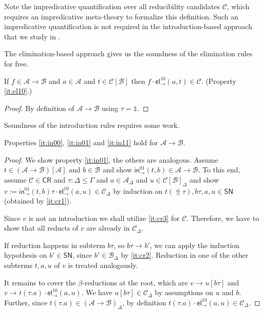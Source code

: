 \documentclass[a4paper,USenglish,cleveref, autoref, thm-restate]{lipics-v2021}
\newcommand{\sid}{\mathds{1}}
\newcommand{\tin}{\ensuremath{\mathsf{in}}}
\newcommand{\inn}[2]{\ensuremath{\tin_{#1}^{#2}}}
\newcommand{\tel}{\mathsf{el}}
\newcommand{\el}[2]{\ensuremath{\tel_{#1}^{#2}}}
\newcommand{\red}[1][]{\longrightarrow_{#1}}
\newcommand{\CR}{\mathsf{CR}}
\newcommand{\A}{\mathcal{A}}
\newcommand{\B}{\mathcal{B}}
\newcommand{\C}{\mathcal{C}}
\newcommand{\SN}{\mathsf{SN}}
\newcommand{\Up}{\mathop{\Uparrow}}
\newcommand{\indy}[1]{_{#1}}
\newcommand{\indyp}[2]{(#1)_{#2}}
\newcommand{\ind}[1]{}    %
\newcommand{\indp}[2]{#1} %
\begin{document}
Note the impredicative quantification over all reducibility candidates
$\C$, which requires an impredicative meta-theory to formalize this
definition.  Such an impredicative quantification is not required in
the introduction-based approach that we study in .

The elimination-based approach gives us the soundness of the
elimination rules for free.
\begin{lemma}[Elimination]
  If $f \in \A \to \B$ and $a \in \A$ and $t \in \C[\B]$ then
  $f \cdot \el\to{10}(a,t) \in \C$.
  (Property \ref{it:el10}.)
\end{lemma}
\begin{proof}
  By definition of $\A \to \B$ using $\tau = \sid$.
\end{proof}

Soundness of the introduction rules requires some work.
\begin{lemma}[Introduction]
  Properties \ref{it:in00}, \ref{it:in01} and \ref{it:in11} hold for
  $\A \to \B$.
\end{lemma}
\begin{proof}
  We show property \ref{it:in01}, the others are analogous.  Assume
  $t \in (\A \to \B)[\A]\ind\Gamma$ and $b \in \B\ind\Gamma$ and show
  $\inn\to{01}(t,b) \in \indp{\A \to \B}{\Gamma}$.  To this end, assume
  $\C \in \CR$ and
  $\tau : \Delta \leq \Gamma$ and
  $a \in \A\indy\Delta$ and $u \in \C[\B]\indy\Delta$ and
  show $v := \inn\to{01}(t,b)\tau \cdot \el\to{10}(a,u) \in \C\indy\Delta$ by
  induction on $t(\Up\tau),b\tau,a,u \in \SN$ (obtained by \ref{it:cr1}).

  Since $v$ is not an introduction we shall utilize \ref{it:cr3} for
  $\C$.  Therefore, we have to show that all reducts of $v$ are
  already in $\C\indy\Delta$.

  If reduction happens in subterm $b\tau$, so $b\tau \red b'$, we can apply
  the induction hypothesis on $b' \in \SN$, since $b' \in \B\indy\Delta$
  by \ref{it:cr2}.  Reduction in one of the other subterms $t,a,u$ of
  $v$ is treated analogously.

  It remains to cover the $\beta$-reductions at the root, which are
  $v \red u[b\tau]$ and $v \red t(\tau.a) \cdot \el\to{10}(a,u)$.
  We have $u[b\tau] \in \C\indy\Delta$ by assumptions on $u$ and $b$.  Further, since
  $t(\tau.a) \in \indyp{\A \to \B}{\Delta}$, by definition $t(\tau.a) \cdot
  \el\to{10}(a,u) \in \C\indy\Delta$.
\end{proof}
\end{document}
